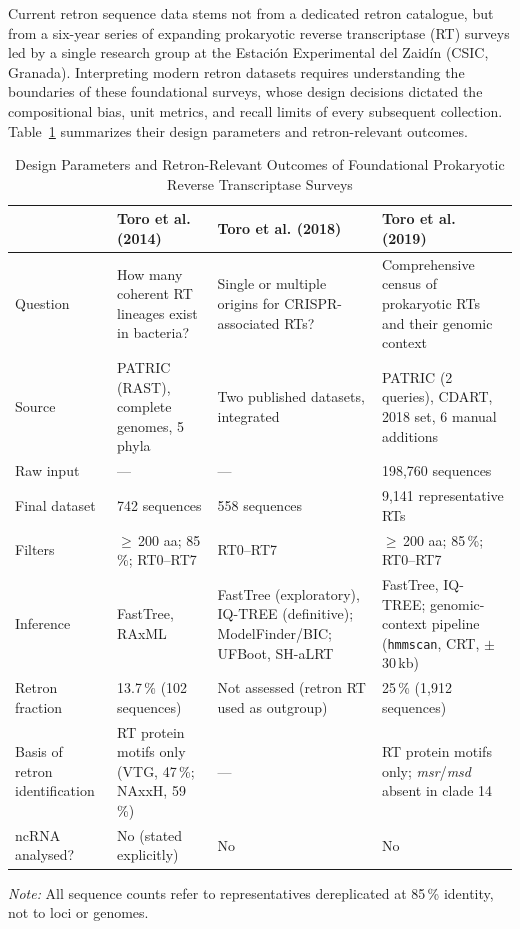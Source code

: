Current retron sequence data stems not from a dedicated retron catalogue, but from a six-year series of expanding prokaryotic reverse transcriptase (RT) surveys led by a single research group at the Estación Experimental del Zaidín (CSIC, Granada). Interpreting modern retron datasets requires understanding the boundaries of these foundational surveys, whose design decisions dictated the compositional bias, unit metrics, and recall limits of every subsequent collection. Table~\ref{tab:rt-surveys} summarizes their design parameters and retron-relevant outcomes.




\begin{table}[H]
\centering
\caption{Design Parameters and Retron-Relevant Outcomes of Foundational Prokaryotic Reverse Transcriptase Surveys}
\label{tab:rt-surveys}
\small
\begin{tabular}{@{}p{}p{}p{}p{}@{}}
\toprule
 & 
\textbf{Toro et al. (2014)} \cite{toro2014} & 
\textbf{Toro et al. (2018)} \cite{toro2018} & 
\textbf{Toro et al. (2019)} \cite{toro2019} \\
\midrule
Question &
How many coherent RT lineages exist in bacteria? &
Single or multiple origins for CRISPR-associated RTs? &
Comprehensive census of prokaryotic RTs and their genomic context \\
\addlinespace
Source &
PATRIC (RAST), complete genomes, 5 phyla &
Two published datasets, integrated &
PATRIC (2 queries), CDART, 2018 set, 6 manual additions \\
\addlinespace
Raw input & --- & --- & 198{,}760 sequences \\
\addlinespace
Final dataset & 742 sequences & 558 sequences & 9{,}141 representative RTs \\
\addlinespace
Filters &
$\geq$\,200 aa; 85\,\%; RT0--RT7 &
RT0--RT7 &
$\geq$\,200 aa; 85\,\%; RT0--RT7 \\
\addlinespace
Inference &
FastTree, RAxML &
FastTree (exploratory), IQ-TREE (definitive); ModelFinder/BIC; UFBoot, SH-aLRT &
FastTree, IQ-TREE; genomic-context pipeline (\texttt{hmmscan}, CRT, $\pm$30\,kb) \\
\addlinespace
Retron fraction &
13.7\,\% (102 sequences) &
Not assessed (retron RT used as outgroup) &
25\,\% (1{,}912 sequences) \\
\addlinespace
Basis of retron identification &
RT protein motifs only (VTG, 47\,\%; NAxxH, 59\,\%) &
--- &
RT protein motifs only; \textit{msr}/\textit{msd} absent in clade 14 \\
\addlinespace
ncRNA analysed? & No (stated explicitly) & No & No \\
\bottomrule
\end{tabular}
\begin{pbox}{\textwidth}
\vspace{4pt}
\scriptsize \textit{Note:} All sequence counts refer to representatives dereplicated at 85\,\% identity, not to loci or genomes.
\end{pbox}
\end{table}


